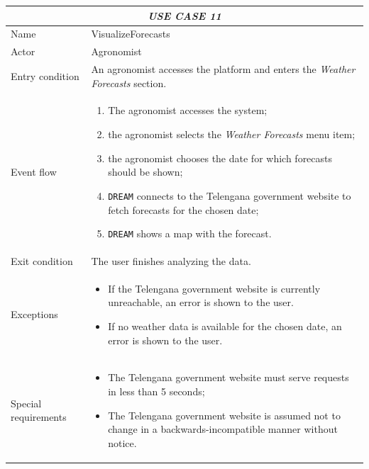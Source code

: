 \documentclass{article}
\begin{document}
\centering
\begin{tabular}{|p{3.5cm}|m{8cm}|}
 \hline
 \multicolumn{2}{|c|}{\emph{USE CASE 11}} \\
 \hline
 Name & VisualizeForecasts\\
 \hline
 Actor & Agronomist\\
 \hline
 Entry condition & An agronomist accesses the platform and enters the \emph{Weather Forecasts} section.\\
 \hline
 Event flow & \begin{enumerate}
    \item The agronomist accesses the system;
    \item the agronomist selects the \emph{Weather Forecasts} menu item;
    \item the agronomist chooses the date for which forecasts should be shown;
    \item \verb|DREAM| connects to the Telengana government website to fetch forecasts for the chosen date;
    \item \verb|DREAM| shows a map with the forecast.
 \end{enumerate}\\
 \hline
 Exit condition & The user finishes analyzing the data.\\
 \hline
 Exceptions & \begin{itemize}
     \item If the Telengana government website is currently unreachable, an error is shown to the user.
     \item If no weather data is available for the chosen date, an error is shown to the user.
 \end{itemize}\\
 \hline
 Special requirements &\begin{itemize}
     \item The Telengana government website must serve requests in less than 5 seconds;
     \item The Telengana government website is assumed not to change in a backwards-incompatible manner without notice.
 \end{itemize}\\
 \hline
\end{tabular}
\end{document}
